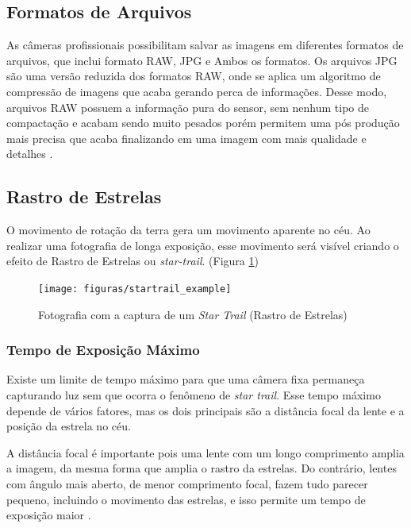 \subsection{Formatos de Arquivos}

As câmeras profissionais possibilitam salvar as imagens em diferentes formatos de arquivos, que inclui formato RAW, JPG e Ambos os formatos. Os arquivos JPG são uma versão reduzida dos formatos RAW, onde se aplica um algoritmo de compressão de imagens que acaba gerando perca de informações. Desse modo, arquivos RAW possuem a informação pura do sensor, sem nenhum tipo de compactação e acabam sendo muito pesados porém permitem uma pós produção mais precisa que acaba finalizando em uma imagem com mais qualidade e detalhes \cite{book:bbcsky}.

\subsection{Rastro de Estrelas}

O movimento de rotação da terra gera um movimento aparente no céu. Ao realizar uma fotografia de longa exposição, esse movimento será visível criando o efeito de Rastro de Estrelas ou \textit{star-trail}. (Figura \ref{fig:startrail_example})

\begin{figure}[!htb]
	\centering
	\caption{Fotografia com a captura de um \textit{Star Trail} (Rastro de Estrelas)}
	\texttt{[image: figuras/startrail\_example]}
	\label{fig:startrail_example}
\end{figure}

\subsubsection{Tempo de Exposição Máximo}
\label{sec:TempoMax}

Existe um limite de tempo máximo para que uma câmera fixa permaneça capturando luz sem que ocorra o fenômeno de \textit{star trail}. Esse tempo máximo depende de vários fatores, mas os dois principais são a distância focal da lente e a posição da estrela no céu.

A distância focal é importante pois uma lente com um longo comprimento amplia a imagem, da mesma forma que amplia o rastro da estrelas. Do contrário, lentes com ângulo mais aberto, de menor comprimento focal, fazem tudo parecer pequeno, incluindo o movimento das estrelas, e isso permite um tempo de exposição maior \cite{book:astrophotographyAmateur}.

